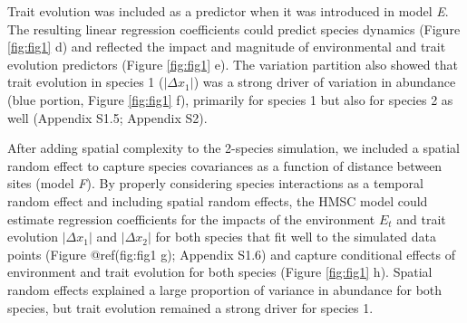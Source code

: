 \documentclass[
]{article}
\begin{document}
Trait evolution was included as a predictor when it was introduced in model \emph{E}. The resulting linear regression coefficients could predict species dynamics (Figure \ref{fig:fig1} d) and reflected the impact and magnitude of environmental and trait evolution predictors (Figure \ref{fig:fig1} e). The variation partition also showed that trait evolution in species 1 (\(|\Delta x_1|\)) was a strong driver of variation in abundance (blue portion, Figure \ref{fig:fig1} f), primarily for species 1 but also for species 2 as well (Appendix S1.5; Appendix S2).

After adding spatial complexity to the 2-species simulation, we included a spatial random effect to capture species covariances as a function of distance between sites (model \emph{F}). By properly considering species interactions as a temporal random effect and including spatial random effects, the HMSC model could estimate regression coefficients for the impacts of the environment \(E_t\) and trait evolution \(|\Delta x_1|\) and \(|\Delta x_2|\) for both species that fit well to the simulated data points (Figure @ref(fig:fig1 g); Appendix S1.6) and capture conditional effects of environment and trait evolution for both species (Figure \ref{fig:fig1} h). Spatial random effects explained a large proportion of variance in abundance for both species, but trait evolution remained a strong driver for species 1.
\end{document}
